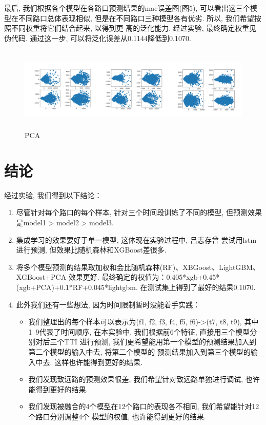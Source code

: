 \documentclass[a4paper,UTF8]{article}
\begin{document}
\begin{enumerate}
      最后, 我们根据各个模型在各路口预测结果的mae误差图(图5), 可以看出这三个模型在不同路口总体表现相似, 
      但是在不同路口三种模型各有优劣. 所以, 我们希望按照不同权重将它们结合起来, 以得到更
      高的泛化能力. 经过实验, 最终确定权重见伪代码. 通过这一步, 可以将泛化误差从0.1144降低到0.1070.

      \begin{figure}[htbp]
        \centering
        \includegraphics[height=4cm]{PCA.png}
        \caption{PCA}
      \end{figure}

  \end{enumerate}
\section{结论}
经过实验, 我们得到以下结论：
\begin{enumerate}
  \item 尽管针对每个路口的每个样本, 针对三个时间段训练了不同的模型, 
  但预测效果是model1 > model2 > model3.
  \item 集成学习的效果要好于单一模型, 这体现在实验过程中, 吕志存曾
  尝试用lstm进行预测, 但效果比随机森林和XGBoost差很多.
  \item 将多个模型预测的结果取加权和会比随机森林(RF)、XBGoost、LightGBM、XGBoost+PCA
  效果更好. 最终确定的权值为：0.405*xgb+0.45*(xgb+PCA)+0.1*RF+0.045*lightgbm. 
  在测试集上得到了最好的结果0.1070.
  \item 此外我们还有一些想法, 因为时间限制暂时没能着手实践：
    \begin{itemize}
      \item 我们整理出的每个样本可以表示为(f1, f2, f3, f4, f5, f6)->(t7, t8, t9), 
      其中1~9代表了时间顺序, 在本实验中, 我们根据前6个特征, 直接用三个模型分别对后三个TTI
      进行预测, 我们更希望能用第一个模型的预测结果加入到第二个模型的输入中去, 将第二个模型的
      预测结果加入到第三个模型的输入中去. 这样也许能得到更好的结果. 
      \item 我们发现致远路的预测效果很差, 我们希望针对致远路单独进行调试, 也许能得到更好的结果. 
      \item 我们发现被融合的4个模型在12个路口的表现各不相同, 我们希望能针对12个路口分别调整4个
      模型的权值, 也许能得到更好的结果. 
    \end{itemize}
\end{enumerate}
\end{document}

